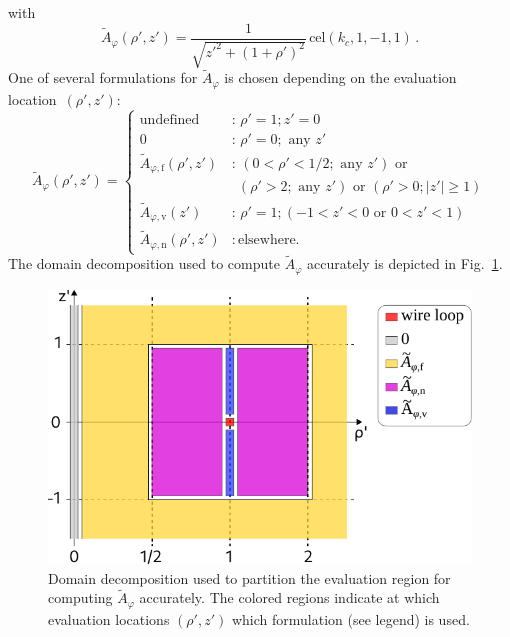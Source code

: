 with
\begin{equation}
  \tilde{A}_\varphi(\rho',z')
  = \frac{1}{\sqrt{z'^2 + (1 + \rho')^2}} \,\mathrm{cel}(k_c, 1, -1, 1) \, .
\end{equation}
One of several formulations for $\tilde{A}_\varphi$ is chosen depending on the evaluation location~$(\rho', z')$:
\begin{equation}
  \tilde{A}_\varphi (\rho', z') =
  \begin{cases}
    \textrm{undefined}                         &:\, \rho' = 1; z' = 0 \\
    0                                          &:\, \rho' = 0; \textrm{ any } z' \\
    \tilde{A}_{\varphi,\mathrm{f}} (\rho', z') &:\, (0 < \rho' < 1/2; \textrm{ any } z') \textrm{ or } \\
                   ~                           &~~     (\rho' > 2;   \textrm{ any } z') \textrm{ or } (\rho' > 0; |z'| \geq 1) \\
    \tilde{A}_{\varphi,\mathrm{v}} (z')        &:\, \rho' = 1; ( -1 < z' < 0 \textrm{ or } 0 < z' < 1) \\
    \tilde{A}_{\varphi,\mathrm{n}} (\rho', z') &:\, \textrm{elsewhere.}
  \end{cases} \label{eqn:A_phi_final}
\end{equation}
The domain decomposition used to compute $\tilde{A}_\varphi$ accurately is depicted in Fig.~\ref{fig:cwl_A_phi_regions}.
\begin{figure}[htbp]
    \centering
    \includegraphics{img/cwl_A_phi_regions.pdf}
    \caption{Domain decomposition used to partition the evaluation region
             for computing $\tilde{A}_\varphi$ accurately.
             The colored regions indicate at which evaluation locations $(\rho',z')$
             which formulation (see legend) is used.}
    \label{fig:cwl_A_phi_regions}
\end{figure}

